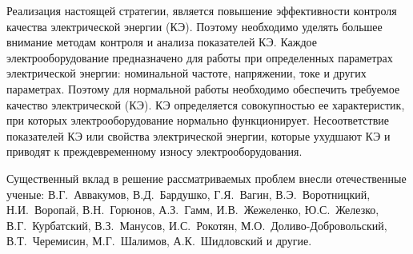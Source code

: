Реализация настоящей стратегии, является повышение эффективности 
контроля качества электрической энергии (КЭ). Поэтому необходимо уделять большее внимание методам контроля и анализа показателей КЭ. 
Каждое электрооборудование предназначено для работы при определенных параметрах электрической энергии: номинальной частоте, напряжении, токе и других параметрах. Поэтому для нормальной работы необходимо обеспечить требуемое качество электрической (КЭ).  КЭ определяется совокупностью ее характеристик, при которых электрооборудование нормально функционирует. Несоответствие показателей КЭ или свойства электрической энергии, которые ухудшают КЭ и приводят к преждевременному износу электрооборудования. 

Существенный вклад в решение рассматриваемых проблем внесли отечественные ученые: В.Г.~Аввакумов, В.Д.~Бардушко, Г.Я.~Вагин, В.Э.~Воротницкий, Н.И.~Воропай, В.Н.~Горюнов, А.З.~Гамм, И.В.~Жежеленко, Ю.С.~Железко, В.Г.~Курбатский, В.З.~Манусов, И.С.~Рокотян, М.О.~Доливо-Добровольский, В.Т.~Черемисин, М.Г.~Шалимов, А.К.~Шидловский и другие. 

